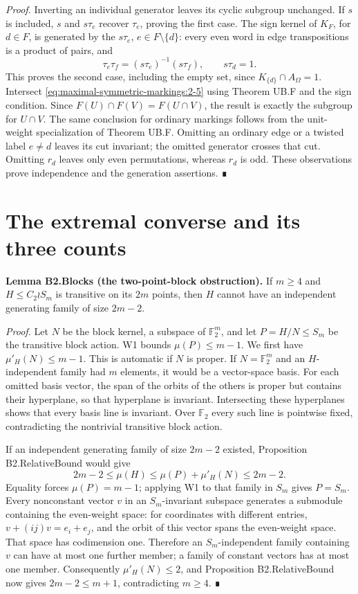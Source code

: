 \emph{Proof.} Inverting an individual generator leaves its cyclic subgroup unchanged. If \(s\) is included, \(s\) and \(s\tau_e\) recover \(\tau_e\), proving the first case. The sign kernel of \(K_F\), for \(d\in F\), is generated by the \(s\tau_e\), \(e\in F\setminus\{d\}\): every even word in edge transpositions is a product of pairs, and \[
\tau_e\tau_f=(s\tau_e)^{-1}(s\tau_f),\qquad s\tau_d=1.
\] This proves the second case, including the empty set, since \(K_{\{d\}}\cap A_\Omega=1\). Intersect \eqref{eq:maximal-symmetric-markings:2-5} using Theorem UB.F and the sign condition. Since \(F(U)\cap F(V)=F(U\cap V)\), the result is exactly the subgroup for \(U\cap V\). The same conclusion for ordinary markings follows from the unit-weight specialization of Theorem UB.F. Omitting an ordinary edge or a twisted label \(e\ne d\) leaves its cut invariant; the omitted generator crosses that cut. Omitting \(r_d\) leaves only even permutations, whereas \(r_d\) is odd. These observations prove independence and the generation assertions. ∎
\section{The extremal converse and its three counts}
\textbf{Lemma B2.Blocks (the two-point-block obstruction).} If \(m\geq4\) and \(H\leq C_2\wr S_m\) is transitive on its \(2m\) points, then \(H\) cannot have an independent generating family of size \(2m-2\).

\emph{Proof.} Let \(N\) be the block kernel, a subspace of \(\mathbb F_2^m\), and let \(P=H/N\leq S_m\) be the transitive block action. W1 bounds \(\mu(P)\leq m-1\). We first have \(\mu'_H(N)\leq m-1\). This is automatic if \(N\) is proper. If \(N=\mathbb F_2^m\) and an \(H\)-independent family had \(m\) elements, it would be a vector-space basis. For each omitted basis vector, the span of the orbits of the others is proper but contains their hyperplane, so that hyperplane is invariant. Intersecting these hyperplanes shows that every basis line is invariant. Over \(\mathbb F_2\) every such line is pointwise fixed, contradicting the nontrivial transitive block action.

If an independent generating family of size \(2m-2\) existed, Proposition B2.RelativeBound would give \[
2m-2\leq\mu(H)\leq\mu(P)+\mu'_H(N)\leq2m-2.
\] Equality forces \(\mu(P)=m-1\); applying W1 to that family in \(S_m\) gives \(P=S_m\). Every nonconstant vector \(v\) in an \(S_m\)-invariant subspace generates a submodule containing the even-weight space: for coordinates with different entries, \(v+(ij)v=e_i+e_j\), and the orbit of this vector spans the even-weight space. That space has codimension one. Therefore an \(S_m\)-independent family containing \(v\) can have at most one further member; a family of constant vectors has at most one member. Consequently \(\mu'_H(N)\leq2\), and Proposition B2.RelativeBound now gives \(2m-2\leq m+1\), contradicting \(m\geq4\). ∎


